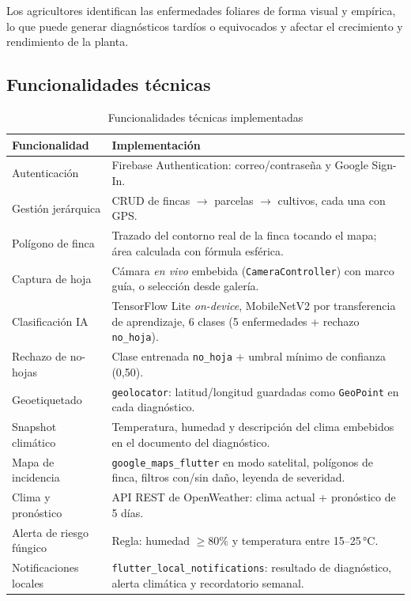 \documentclass[12pt,a4paper]{article}
\begin{document}
Los agricultores identifican las enfermedades foliares de forma visual y
empírica, lo que puede generar diagnósticos tardíos o equivocados y afectar el
crecimiento y rendimiento de la planta.

\subsection{Funcionalidades técnicas}

\begin{table}[H]
\centering
\caption{Funcionalidades técnicas implementadas}
\label{tab:funcionalidades}
\renewcommand{\arraystretch}{1.25}
\begin{tabular}{p{4.3cm} p{9.2cm}}
\toprule
\bfseries Funcionalidad & \bfseries Implementación \\
\midrule
Autenticación & Firebase Authentication: correo/contraseña y Google Sign-In. \\
Gestión jerárquica & CRUD de fincas $\rightarrow$ parcelas $\rightarrow$ cultivos, cada una con GPS. \\
Polígono de finca & Trazado del contorno real de la finca tocando el mapa; área calculada con fórmula esférica. \\
Captura de hoja & Cámara \textit{en vivo} embebida (\texttt{CameraController}) con marco guía, o selección desde galería. \\
Clasificación IA & TensorFlow Lite \textit{on-device}, MobileNetV2 por transferencia de aprendizaje, 6 clases (5 enfermedades + rechazo \texttt{no\_hoja}). \\
Rechazo de no-hojas & Clase entrenada \texttt{no\_hoja} + umbral mínimo de confianza (0{,}50). \\
Geoetiquetado & \texttt{geolocator}: latitud/longitud guardadas como \texttt{GeoPoint} en cada diagnóstico. \\
Snapshot climático & Temperatura, humedad y descripción del clima embebidos en el documento del diagnóstico. \\
Mapa de incidencia & \texttt{google\_maps\_flutter} en modo satelital, polígonos de finca, filtros con/sin daño, leyenda de severidad. \\
Clima y pronóstico & API REST de OpenWeather: clima actual + pronóstico de 5 días. \\
Alerta de riesgo fúngico & Regla: humedad $\geq 80\%$ y temperatura entre 15--25\,°C. \\
Notificaciones locales & \texttt{flutter\_local\_notifications}: resultado de diagnóstico, alerta climática y recordatorio semanal. \\

\end{tabular}
\end{table}
\end{document}
